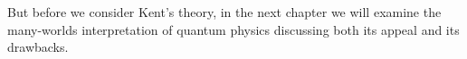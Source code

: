 But before we consider Kent's theory, in the next chapter we will examine the many-worlds interpretation of quantum physics discussing both its appeal and its drawbacks.